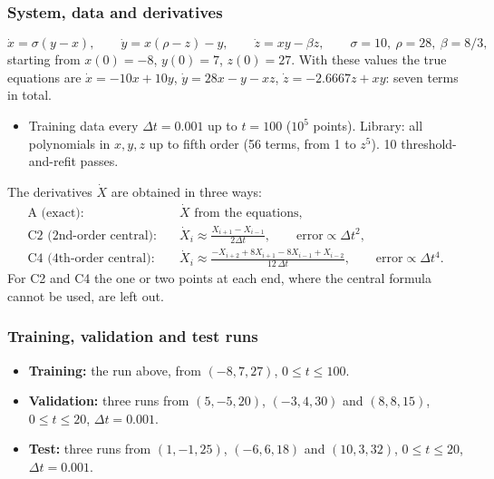 \documentclass[11pt,a4paper]{article}
\begin{document}
\subsubsection{System, data and derivatives}
\begin{equation}
  \dot x=\sigma(y-x),\qquad \dot y = x(\rho-z)-y,\qquad \dot z=xy-\beta z,\qquad
  \sigma=10,\ \rho=28,\ \beta=8/3,
\end{equation}
starting from $x(0)=-8$, $y(0)=7$, $z(0)=27$. With these values the true equations are $\dot x=-10x+10y$, $\dot y=28x-y-xz$, $\dot z=-2.6667z+xy$: seven terms in total.
\begin{itemize}
  \item Training data every $\Delta t=0.001$ up to $t=100$ ($10^5$ points). Library: all polynomials in $x,y,z$ up to fifth order (56 terms, from 1 to $z^5$). 10 threshold-and-refit passes.
\end{itemize}
The derivatives $\dot X$ are obtained in three ways:
\begin{align*}
  \text{A (exact):}\quad & \dot X \text{ from the equations},\\
  \text{C2 (2nd-order central):}\quad & \dot X_i \approx \frac{X_{i+1}-X_{i-1}}{2\Delta t}, \qquad \text{error} \propto \Delta t^2,\\
  \text{C4 (4th-order central):}\quad & \dot X_i \approx \frac{-X_{i+2}+8X_{i+1}-8X_{i-1}+X_{i-2}}{12\,\Delta t}, \qquad \text{error}\propto\Delta t^4 .
\end{align*}
For C2 and C4 the one or two points at each end, where the central formula cannot be used, are left out.

\begin{table}[H]\centering\small

\caption{Lorenz coefficients of the model selected by R4 (Section~\ref{sec:lorenz-apply}). All other 161 coefficients are zero. Last row: maximum coefficient error (Section~\ref{sec:lorenz-err}).}
\label{tab:lorenz-coefs}
\end{table}

\subsubsection{Training, validation and test runs}
\begin{itemize}
  \item \textbf{Training:} the run above, from $(-8,7,27)$, $0\le t\le100$.
  \item \textbf{Validation:} three runs from $(5,-5,20)$, $(-3,4,30)$ and $(8,8,15)$, $0\le t\le 20$, $\Delta t=0.001$.
  \item \textbf{Test:} three runs from $(1,-1,25)$, $(-6,6,18)$ and $(10,3,32)$, $0\le t\le 20$, $\Delta t=0.001$.
\end{itemize}
\end{document}

